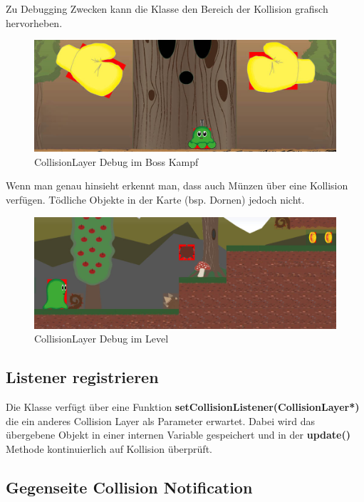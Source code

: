 Zu Debugging Zwecken kann die  Klasse den Bereich der Kollision grafisch hervorheben.

\begin{figure}[H]
  \centering
  \includegraphics[width=\textwidth - 50pt]{resources/CollisionLayer_BossKampf.jpg}
  \caption{CollisionLayer Debug im Boss Kampf}
  \label{fig:collision_debug_boss} 
\end{figure}

Wenn man genau hinsieht erkennt man, dass auch Münzen über eine Kollision verfügen. Tödliche Objekte in der Karte (bsp. Dornen) jedoch nicht.

\begin{figure}[H]
  \centering
  \includegraphics[width=\textwidth - 50pt]{resources/CollisionLayer_Level}
  \caption{CollisionLayer Debug im Level}
  \label{fig:collision_debug_level} 
\end{figure}


\subsection{Listener registrieren}

Die Klasse verfügt über eine Funktion \textbf{setCollisionListener(CollisionLayer*)} die ein anderes Collision Layer als Parameter erwartet. Dabei wird das übergebene Objekt in einer internen Variable gespeichert und in der \textbf{update()} Methode kontinuierlich auf Kollision überprüft.

\subsection{Gegenseite Collision Notification}

